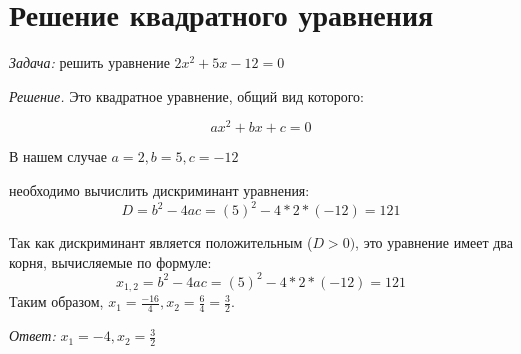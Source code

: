 \documentclass{article}
\begin{document}
\section{Решение квадратного уравнения}

\textit {Задача:} решить уравнение $2x^2 + 5x - 12 = 0$

\textit {Решение.} Это квадратное уравнение, общий вид которого:

\[ ax^2 + bx + c= 0 \]

В нашем случае $a = 2, b = 5, c = -12$

 необходимо вычислить дискриминант уравнения:
\[D = b^2 - 4ac = (5)^2 - 4 * 2 * (-12) = 121\]

Так как дискриминант является положительным ($D > 0)$, это уравнение
имеет два корня, вычисляемые по формуле:
\[x_{1,2} = b^2 - 4ac = (5)^2 - 4 * 2 * (-12) = 121\]
Таким образом, $x_1 = \frac{-16}{4} , x_2 = \frac{6}{4} = \frac{3}{2}.$

\quad \textit{Ответ:} $x_1 = -4, x_2 = \frac{3}{2}$
\end{document}
